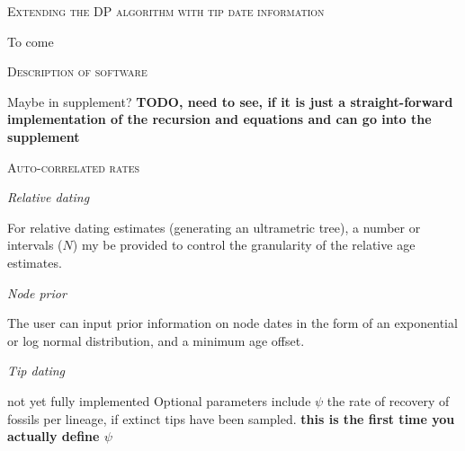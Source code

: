 \documentclass{llncs}
\newcommand{\ejmcomment}[1]{{\color{green} #1}}
\renewcommand{\section}[1]{%
\bigskip
\begin{center}
\begin{Large}
\normalfont\scshape #1
\medskip
\end{Large}
\end{center}}
\renewcommand{\subsection}[1]{%
\bigskip
\begin{center}
\begin{large}
\normalfont\itshape #1
\end{large}
\end{center}}
\begin{document}
\section{Extending the DP algorithm with tip date information}
To come

\section{Description of software}
Maybe in supplement? 
{\bf TODO, need to see, if it is just a straight-forward implementation of the recursion and equations and can go into the supplement}

\section {Auto-correlated rates}


\subsection{Relative dating}
For relative dating estimates (generating an ultrametric tree), a number or
intervals ($N$) my be provided to control the granularity of the relative age
estimates.


\subsection{Node prior}
The user can input prior information on node dates in the form of an exponential
or log normal distribution, and a minimum age offset.



\subsection{Tip dating}
\ejmcomment{not yet fully implemented}
Optional parameters include $\psi$ the rate of recovery of fossils per lineage, 
if extinct tips have been sampled. {\bf this is the first time you actually define $\psi$}
\end{document}
